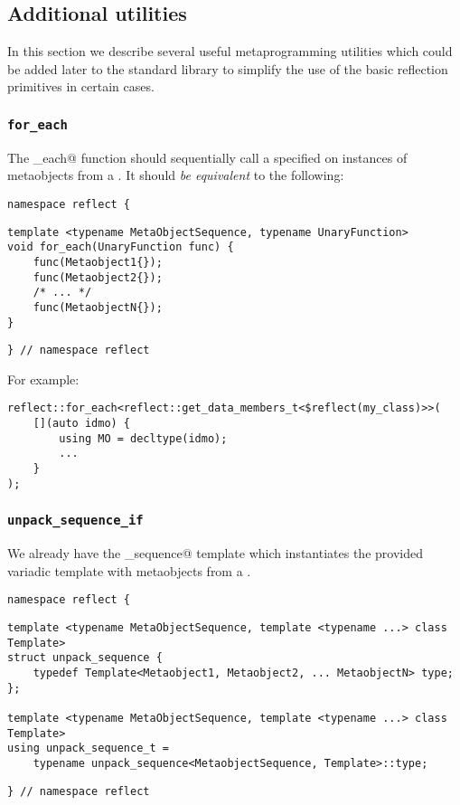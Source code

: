 \subsection{Additional utilities}
\label{fut-facade}

In this section we describe several useful metaprogramming utilities which
could be added later to the standard library to simplify the use of the basic
reflection primitives in certain cases.
 
\subsubsection{\texttt{for\_each}}
\label{fac-for-each}

The \verb@for_each@ function should sequentially call a specified
\verb@UnaryFunction@ on instances of metaobjects from
a . It should {\em be equivalent} to the following:

\begin{verbatim}
namespace reflect {
\end{verbatim}
\begin{verbatim}
template <typename MetaObjectSequence, typename UnaryFunction>
void for_each(UnaryFunction func) {
	func(Metaobject1{});
	func(Metaobject2{});
	/* ... */
	func(MetaobjectN{});
}
\end{verbatim}
\begin{verbatim}
} // namespace reflect
\end{verbatim}

For example:

\begin{verbatim}
reflect::for_each<reflect::get_data_members_t<$reflect(my_class)>>(
	[](auto idmo) {
		using MO = decltype(idmo);
		...
	}
);
\end{verbatim}

\subsubsection{\texttt{unpack\_sequence\_if}}
\label{fac-unpack-sequence}

We already have the \verb@unpack_sequence@ template which instantiates
the provided variadic template with metaobjects from a .

\begin{verbatim}
namespace reflect {
\end{verbatim}
\begin{verbatim}
template <typename MetaObjectSequence, template <typename ...> class Template>
struct unpack_sequence {
	typedef Template<Metaobject1, Metaobject2, ... MetaobjectN> type;
};

template <typename MetaObjectSequence, template <typename ...> class Template>
using unpack_sequence_t =
	typename unpack_sequence<MetaobjectSequence, Template>::type;
\end{verbatim}
\begin{verbatim}
} // namespace reflect
\end{verbatim}

